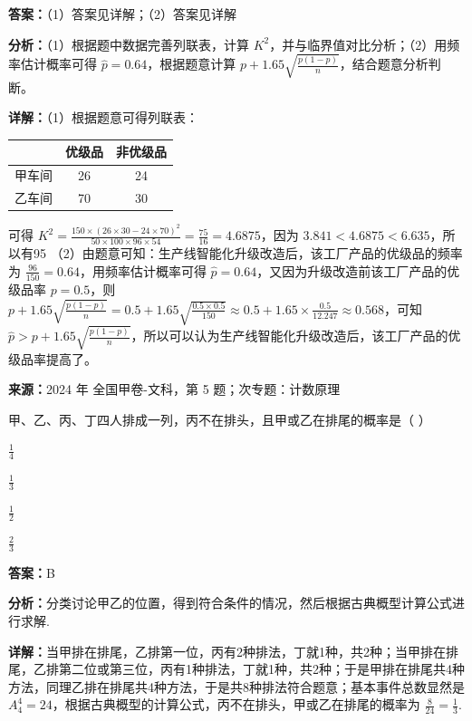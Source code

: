 \begin{question}[points=12]
\begin{tabular}{c|ccc}
\end{tabular}
\begin{solution}
\textbf{答案：}（1）答案见详解；（2）答案见详解

\textbf{分析：}（1）根据题中数据完善列联表，计算 $K^2$，并与临界值对比分析；（2）用频率估计概率可得 $\hat{p}=0.64$，根据题意计算 $p+1.65\sqrt{\frac{p(1-p)}{n}}$，结合题意分析判断。

\textbf{详解：}（1）根据题意可得列联表：
\begin{tabular}{c|c|c}
& 优级品 & 非优级品 \\
\hline
甲车间 & 26 & 24 \\
乙车间 & 70 & 30 \\
\end{tabular}
可得 $K^2=\frac{150\times(26\times30-24\times70)^2}{50\times100\times96\times54}=\frac{75}{16}=4.6875$，因为 $3.841<4.6875<6.635$，所以有95%
（2）由题意可知：生产线智能化升级改造后，该工厂产品的优级品的频率为 $\frac{96}{150}=0.64$，用频率估计概率可得 $\hat{p}=0.64$，又因为升级改造前该工厂产品的优级品率 $p=0.5$，则 $p+1.65\sqrt{\frac{p(1-p)}{n}}=0.5+1.65\sqrt{\frac{0.5\times0.5}{150}}\approx0.5+1.65\times\frac{0.5}{12.247}\approx0.568$，可知 $\hat{p}>p+1.65\sqrt{\frac{p(1-p)}{n}}$，所以可以认为生产线智能化升级改造后，该工厂产品的优级品率提高了。
\end{solution}
\end{question}

\begin{question}[points=5]
\textbf{来源：}2024 年 全国甲卷-文科，第 5 题；次专题：计数原理\par
甲、乙、丙、丁四人排成一列，丙不在排头，且甲或乙在排尾的概率是（ ）
\begin{choices}
  \item $\frac{1}{4}$
  \item $\frac{1}{3}$
  \item $\frac{1}{2}$
  \item $\frac{2}{3}$
\end{choices}
\begin{solution}
\textbf{答案：}B

\textbf{分析：}分类讨论甲乙的位置，得到符合条件的情况，然后根据古典概型计算公式进行求解.

\textbf{详解：}当甲排在排尾，乙排第一位，丙有2种排法，丁就1种，共2种；当甲排在排尾，乙排第二位或第三位，丙有1种排法，丁就1种，共2种；于是甲排在排尾共4种方法，同理乙排在排尾共4种方法，于是共8种排法符合题意；基本事件总数显然是 $A_4^4 = 24$，根据古典概型的计算公式，丙不在排头，甲或乙在排尾的概率为 $\frac{8}{24} = \frac{1}{3}$.
\end{solution}
\end{question}

